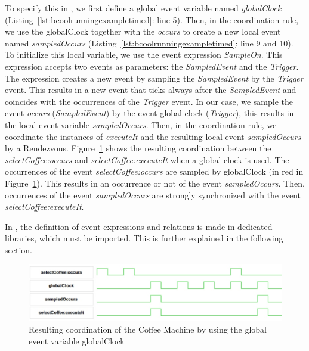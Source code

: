 To specify this in \bcool, we first define a global event variable named \emph{globalClock} (Listing~\ref{lst:bcoolrunningexampletimed}: line 5). Then, in the coordination rule, we use the globalClock together with the \dse \emph{occurs} to create a new local event named \emph{sampledOccurs} (Listing~\ref{lst:bcoolrunningexampletimed}: line 9 and 10). To initialize this local variable, we use the event expression \emph{SampleOn}. This expression accepts two events as parameters: the \emph{SampledEvent} and the \emph{Trigger}. The expression creates a new event by sampling the \emph{SampledEvent} by the \emph{Trigger} event. This results in a new event that ticks always after the \emph{SampledEvent} and coincides with the occurrences of the \emph{Trigger} event. In our case, we sample the event \emph{occurs} (\ie \emph{SampledEvent}) by the event global clock (\ie \emph{Trigger}), this results in the local event variable \emph{sampledOccurs}. Then, in the coordination rule, we coordinate the instances of \dse \emph{executeIt} and the resulting local event \emph{sampledOccurs} by a Rendezvous. Figure~\ref{fig:runningeventvar} shows the resulting coordination between the \mse \emph{selectCoffee:occurs} and \emph{selectCoffee:executeIt} when a global clock is used. The occurrences of the event \emph{selectCoffee:occurs} are sampled by globalClock (in red in Figure~\ref{fig:runningeventvar}). This results in an occurrence or not of the event \emph{sampledOccurs}. Then, occurrences of the event \emph{sampledOccurs} are strongly synchronized with the event \emph{selectCoffee:executeIt}. 

In \bcool, the definition of event expressions and relations is made in dedicated libraries, which must be imported. This is further explained in the following section.
	
		
		\begin{figure}[h]
			\center
			\includegraphics[width=.8\textwidth]{bcool/figs/runningeventvar}
			\caption{Resulting coordination of the Coffee Machine by using the global event variable globalClock}
			\label{fig:runningeventvar}
		\end{figure}
		
	
	
